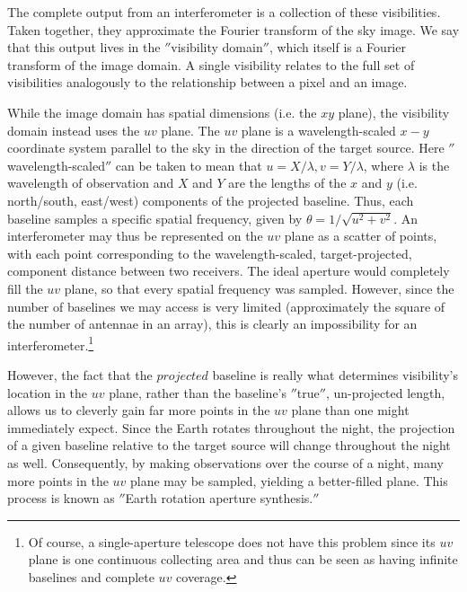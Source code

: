 

The complete output from an interferometer is a collection of these visibilities. Taken together, they approximate the Fourier transform of the sky image. We say that this output lives in the $''$visibility domain$''$, which itself is a Fourier transform of the image domain. A single visibility relates to the full set of visibilities analogously to the relationship between a pixel and an image.


While the image domain has spatial dimensions (i.e. the $xy$ plane), the visibility domain instead uses the $uv$ plane. The $uv$ plane is a wavelength-scaled $x-y$ coordinate system parallel to the sky in the direction of the target source. Here $''$wavelength-scaled$''$ can be taken to mean that $u = X/\lambda, v = Y/\lambda$, where $\lambda$ is the wavelength of observation and $X$ and $Y$ are the lengths of the $x$ and $y$ (i.e. north/south, east/west) components of the projected baseline. Thus, each baseline samples a specific spatial frequency, given by $\theta = 1/\sqrt{u^2 + v^2}$. An interferometer may thus be represented on the $uv$ plane as a scatter of points, with each point corresponding to the wavelength-scaled, target-projected, component distance between two receivers. The ideal aperture would completely fill the $uv$ plane, so that every spatial frequency was sampled. However, since the number of baselines we may access is very limited (approximately the square of the number of antennae in an array), this is clearly an impossibility for an interferometer.\footnote{Of course, a single-aperture telescope does not have this problem since its $uv$ plane is one continuous collecting area and thus can be seen as having infinite baselines and complete $uv$ coverage.}


However, the fact that the $projected$ baseline is really what determines visibility's location in the $uv$ plane, rather than the baseline's $''$true$''$, un-projected length, allows us to cleverly gain far more points in the $uv$ plane than one might immediately expect. Since the Earth rotates throughout the night, the projection of a given baseline relative to the target source will change throughout the night as well. Consequently, by making observations over the course of a night, many more points in the $uv$ plane may be sampled, yielding a better-filled plane. This process is known as $''$Earth rotation aperture synthesis.$''$

